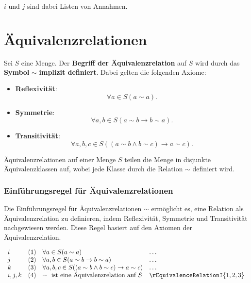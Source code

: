 \documentclass[main.tex]{subfiles}
\begin{document}
\(i\) und \(j\) sind dabei Listen von Annahmen.



\section{Äquivalenzrelationen}

\begin{definition}[Äquivalenzrelation]
    Sei \(S\) eine Menge. Der \textbf{Begriff der Äquivalenzrelation} auf \(S\) wird durch das \textbf{Symbol} \(\sim\) \textbf{implizit definiert}. Dabei gelten die folgenden Axiome:
    
    \begin{itemize}
        \item \textbf{Reflexivität}:
        \[
        \forall a \in S (a \sim a).
        \]
        
        \item \textbf{Symmetrie}: 
        \[
        \forall a, b \in S (a \sim b \rightarrow b \sim a).
        \]
        
        \item \textbf{Transitivität}: 
        \[
        \forall a, b, c \in S ((a \sim b \land b \sim c) \rightarrow a \sim c).
        \]
    \end{itemize}
\end{definition}

\begin{remark}
    Äquivalenzrelationen auf einer Menge \(S\) teilen die Menge in disjunkte Äquivalenzklassen auf, wobei jede Klasse durch die Relation \(\sim\) definiert wird.
\end{remark}

\subsubsection*{Einführungsregel für Äquivalenzrelationen}
\label{rule:rEquivalenceRelationI}
Die Einführungsregel für Äquivalenzrelationen \(\sim\) ermöglicht es, eine Relation als Äquivalenzrelation zu definieren, indem Reflexivität, Symmetrie und Transitivität nachgewiesen werden. Diese Regel basiert auf den Axiomen der Äquivalenzrelation.

\[
\begin{array}{llll}
    i       & (1) & \forall a \in S (a \sim a) & \dots \\
    j       & (2) & \forall a, b \in S (a \sim b \rightarrow b \sim a) & \dots \\
    k       & (3) & \forall a, b, c \in S ((a \sim b \land b \sim c) \rightarrow a \sim c) & \dots \\
    i,j,k   & (4) & \sim \text{ ist eine Äquivalenzrelation auf } S & \rEquivalenceRelationI{1,2,3}
\end{array}
\]
\end{document}
